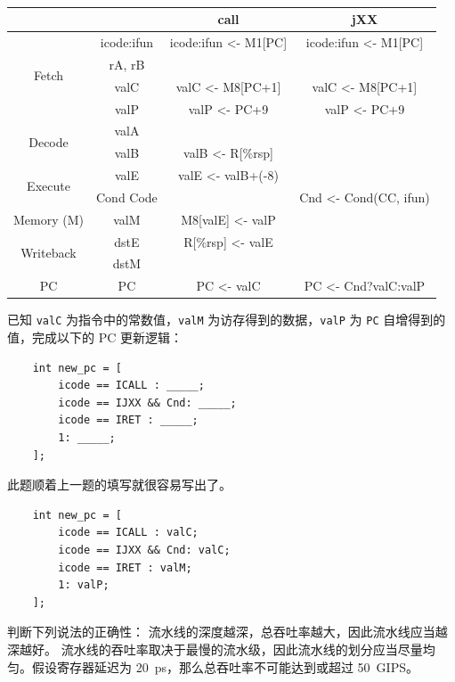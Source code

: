 \begin{problems}
\begin{table}[H]
            \tt
            \centering
            \begin{tabular}{|c|c|c|c|}
                \hline
                &  & call & jXX \\ \hline
                \multirow{4}{*}{Fetch} & icode:ifun & icode:ifun <- M1[PC] & icode:ifun <- M1[PC] \\ \cline{2-4} 
                & rA, rB &  &  \\ \cline{2-4} 
                & valC & valC <- M8[PC+1] & valC <- M8[PC+1] \\ \cline{2-4} 
                & valP & valP <- PC+9 & valP <- PC+9 \\ \hline
                \multirow{2}{*}{Decode} & valA &  &  \\ \cline{2-4} 
                & valB & valB <- R[\%rsp] &  \\ \hline
                \multirow{2}{*}{Execute} & valE & valE <- valB+(-8) &  \\ \cline{2-4} 
                & Cond Code &  & Cnd <- Cond(CC, ifun) \\ \hline
                Memory (M) & valM & M8[valE] <- valP &  \\ \hline
                \multirow{2}{*}{Writeback} & dstE & R[\%rsp] <- valE &  \\ \cline{2-4} 
                & dstM &  &  \\ \hline
                PC & PC & PC <- valC & PC <- Cnd?valC:valP \\ \hline
            \end{tabular}
        \end{table}
        \pro 已知 \verb|valC| 为指令中的常数值，\verb|valM| 为访存得到的数据，\verb|valP| 为 \verb|PC| 自增得到的值，完成以下的 PC 更新逻辑：
        \begin{verbatim}
    int new_pc = [
        icode == ICALL : _____;
        icode == IJXX && Cnd: _____;
        icode == IRET : _____;
        1: _____;
    ];
        \end{verbatim}
        \sol 此题顺着上一题的填写就很容易写出了。
        \begin{verbatim}
    int new_pc = [
        icode == ICALL : valC;
        icode == IJXX && Cnd: valC;
        icode == IRET : valM;
        1: valP;
    ];
        \end{verbatim}
        \pro 判断下列说法的正确性：
            \qn 流水线的深度越深，总吞吐率越大，因此流水线应当越深越好。
            \qn 流水线的吞吐率取决于最慢的流水级，因此流水线的划分应当尽量均匀。\qn 假设寄存器延迟为 \SI{20}{ps}，那么总吞吐率不可能达到或超过 \SI{50}{GIPS}。

\end{problems}
